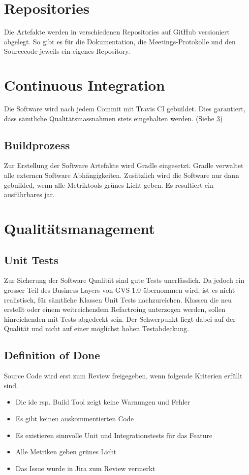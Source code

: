 \documentclass[11pt,a4paper,english,oneside]{book}
\numberwithin{equation}{chapter}
\begin{document}
	\section{Repositories}
	Die Artefakte werden in verschiedenen Repositories auf GitHub versioniert abgelegt. So gibt es für die Dokumentation, die Meetings-Protokolle und den Sourcecode jeweils ein eigenes Repository.

	\section{Continuous Integration}
	Die Software wird nach jedem Commit mit Travis CI \cite{travisci} gebuildet. Dies garantiert, dass sämtliche Qualitätsmassnahmen stets eingehalten werden. (Siehe \ref{sec:qualitymeasures})
	
	\subsection{Buildprozess}
	\label{sec:buildprocess}
	Zur Erstellung der Software Artefakte wird Gradle \cite{gradle} eingesetzt. Gradle verwaltet alle externen Software Abhängigkeiten. Zusätzlich wird die Software nur dann gebuilded, wenn alle Metriktools grünes Licht geben. Es resultiert ein ausführbares \gls{jar}.
		
	\section{Qualitätsmanagement}
	\label{sec:qualitymeasures}
	
	\subsection{Unit Tests}
	Zur Sicherung der Software Qualität sind gute Tests unerlässlich. Da jedoch ein grosser Teil des Business Layers von GVS 1.0 übernommen wird, ist es nicht realistisch, für sämtliche Klassen Unit Tests nachzureichen. Klassen die neu erstellt oder einem weitreichendem Refactroing unterzogen werden, sollen hinreichenden mit Tests abgedeckt sein. Der Schwerpunkt liegt dabei auf der Qualität und nicht auf einer möglichst hohen Testabdeckung.
	
	\subsection{Definition of Done} \label{ssec:dod}
	Source Code wird erst zum Review freigegeben, wenn folgende Kriterien erfüllt sind.
	\begin{itemize}
		\item Die \gls{ide} rsp. Build Tool zeigt keine Warnungen und Fehler
		\item Es gibt keinen auskommentierten Code
		\item Es existieren sinnvolle Unit und Integrationstests für das Feature
		\item Alle Metriken geben grünes Licht
		\item Das Issue wurde in Jira \cite{jira} zum Review vermerkt
	\end{itemize}
		
\end{document}
